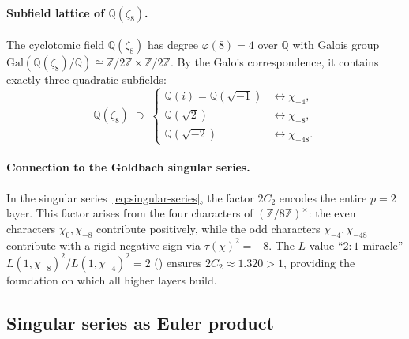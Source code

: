 \documentclass[11pt,a4paper]{article}
\theoremstyle{remark}
\newcommand{\Z}{\mathbb{Z}}
\newcommand{\Q}{\mathbb{Q}}
\begin{document}
\paragraph{Subfield lattice of $\Q(\zeta_8)$.}
The cyclotomic field $\Q(\zeta_8)$ has degree $\varphi(8) = 4$ over $\Q$
with Galois group $\mathrm{Gal}(\Q(\zeta_8)/\Q) \cong \Z/2\Z \times \Z/2\Z$.
By the Galois correspondence, it contains exactly three quadratic subfields:
\begin{equation}
\label{eq:zeta8-subfields}
  \Q(\zeta_8) \;\supset\; \begin{cases}
    \Q(i) = \Q(\sqrt{-1}) & \longleftrightarrow \chi_{-4}, \\[3pt]
    \Q(\sqrt{2}) & \longleftrightarrow \chi_{-8}, \\[3pt]
    \Q(\sqrt{-2}) & \longleftrightarrow \chi_{-48}.
  \end{cases}
\end{equation}

\paragraph{Connection to the Goldbach singular series.}
In the singular series~\eqref{eq:singular-series}, the factor $2C_2$
encodes the entire $p = 2$ layer.  This factor arises from the four
characters of $(\Z/8\Z)^\times$: the even characters $\chi_0, \chi_{-8}$
contribute positively, while the odd characters $\chi_{-4}, \chi_{-48}$
contribute with a rigid negative sign via $\tau(\chi)^2 = -8$.
The $L$-value ``$2{:}1$ miracle'' $L(1,\chi_{-8})^2 / L(1,\chi_{-4})^2 = 2$
() ensures $2C_2 \approx 1.320 > 1$, providing the
foundation on which all higher layers build.

\subsection{Singular series as Euler product}
\label{subsec:euler-product}
\end{document}

